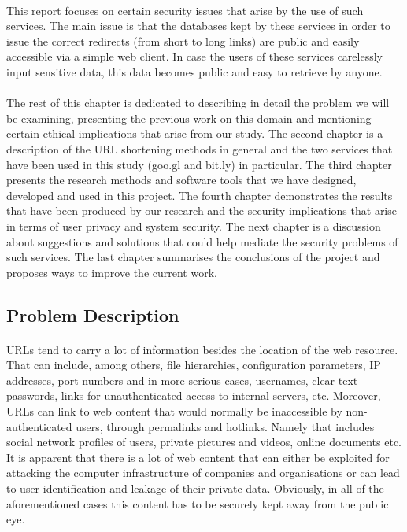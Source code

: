 \documentclass[12pt]{article}
\begin{document}
\paragraph{}
This report focuses on certain security issues that arise by the use of such services. The main issue is that the databases kept by these services in order to issue the correct redirects (from short to long links) are public and easily accessible via a simple web client. In case the users of these services carelessly input sensitive data, this data becomes public and easy to retrieve by anyone.
\paragraph{} 
The rest of this chapter is dedicated to describing in detail the problem we will be examining, presenting the previous work on this domain and mentioning certain ethical implications that arise from our study. The second chapter is a description of the URL shortening methods in general and the two services that have been used in this study (goo.gl and bit.ly) in particular. The third chapter presents the research methods and software tools that we have designed, developed and used in this project. The fourth chapter demonstrates the results that have been produced by our research and the security implications that arise in terms of user privacy and system security. The next chapter is a discussion about suggestions and solutions that could help mediate the security problems of such services. The last chapter summarises the conclusions of the project and proposes ways to improve the current work. 
\newpage
\subsection{Problem Description}

\paragraph{}
URLs tend to carry a lot of information besides the location of the web resource. That can include, among others, file hierarchies, configuration parameters, IP addresses, port numbers and in more serious cases, usernames, clear text passwords, links for unauthenticated access to internal servers, etc. Moreover, URLs can link to web content that would normally be inaccessible by non-authenticated users, through permalinks and hotlinks. Namely that includes social network profiles of users, private pictures and videos, online documents etc. It is apparent that there is a lot of web content that can either be exploited for attacking the computer infrastructure of companies and organisations or can lead to user identification and leakage of their private data. Obviously, in all of the aforementioned cases this content has to be securely kept away from the public eye.
\end{document}
